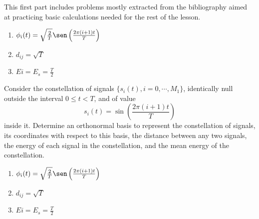 \documentclass[es,boletin]{uah}
\begin{document}
{
	This first part includes problems mostly extracted from the bibliography aimed at practicing basic calculations needed for the rest of the lesson.

}



{
	\begin{enumerate}
		\item $\phi_i(t) = \sqrt{\frac{2}{T}} \sen\left ( \frac{2\pi(i+1)t}{T} \right )$
 	 	\item $d_{ij} = \sqrt{T}$
    	\item $Ei = E_s = \frac{T}{2}$	
	\end{enumerate}
}
{
	\cite{Artes} Consider the constellation of signals $\{s_i(t), i=0,\cdots , M_1\}$, identically null outside the interval $0\leq t<T$, and of value
	\begin{displaymath}
	s_i(t) = \sin\left ( \frac{2\pi(i+1)t}{T} \right )
	\end{displaymath}
	inside it. Determine an orthonormal basis to represent the constellation of signals, its coordinates with respect to this basis, the distance between any two signals, the energy of each signal in the constellation, and the mean energy of the constellation.
}
{
	\begin{enumerate}
		\item $\phi_i(t) = \sqrt{\frac{2}{T}} \sen\left ( \frac{2\pi(i+1)t}{T} \right )$
 	 	\item $d_{ij} = \sqrt{T}$
    	\item $Ei = E_s = \frac{T}{2}$	
	\end{enumerate}
}
\end{document}
